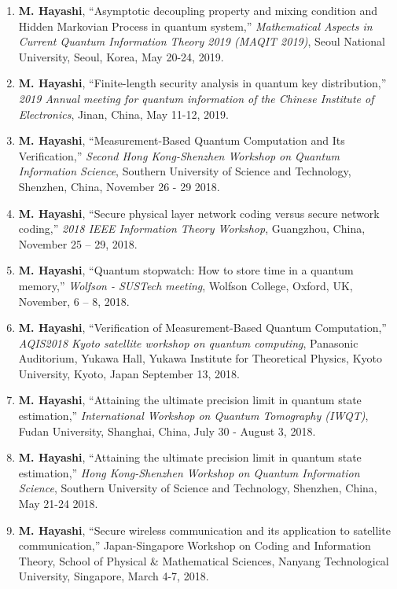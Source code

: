 \documentclass[a4paper,12pt,oneside]{article}
\begin{document}
\begin{enumerate}
\item 
\textbf{M. Hayashi}, 
``Asymptotic decoupling property and mixing condition and Hidden Markovian Process in quantum system,''
{\em Mathematical Aspects in Current Quantum Information Theory 2019 (MAQIT 2019)}, 
Seoul National University, Seoul, Korea,
May 20-24, 2019. 

\item 
\textbf{M. Hayashi}, 
``Finite-length security analysis in quantum key distribution,''
{\em 2019 Annual meeting for quantum information of the Chinese Institute of Electronics},
Jinan, China,
May 11-12, 2019.

\item 
\textbf{M. Hayashi}, 
``Measurement-Based Quantum Computation and Its Verification,''
{\em Second Hong Kong-Shenzhen Workshop on Quantum Information Science}, 
Southern University of Science and Technology, Shenzhen, China,
November 26 - 29 2018.

\item 
\textbf{M. Hayashi}, 
``Secure physical layer network coding versus secure network coding,''
{\em 2018 IEEE Information Theory Workshop}, 
Guangzhou, China, November 25 -- 29, 2018.

\item 
\textbf{M. Hayashi}, 
``Quantum stopwatch: How to store time in a quantum memory,''
{\em Wolfson - SUSTech meeting}, 
Wolfson College, Oxford, UK, November, 6 -- 8,  2018.

\item 
\textbf{M. Hayashi}, 
``Verification of Measurement-Based Quantum Computation,''
{\em AQIS2018 Kyoto satellite workshop on quantum computing}, 
Panasonic Auditorium, Yukawa Hall, Yukawa Institute for Theoretical Physics, Kyoto University, Kyoto, Japan
September 13, 2018.

\item 
\textbf{M. Hayashi}, 
``Attaining the ultimate precision limit in quantum state estimation,''
{\em International Workshop on Quantum Tomography (IWQT)}, 
Fudan University, Shanghai, China,
July 30 - August 3, 2018.


\item 
\textbf{M. Hayashi}, 
``Attaining the ultimate precision limit in quantum state estimation,''
{\em Hong Kong-Shenzhen Workshop on Quantum Information Science}, 
Southern University of Science and Technology, Shenzhen, China,
May 21-24 2018.

\item 
\textbf{M. Hayashi}, ``Secure wireless communication and its application to 
satellite communication,'' 
Japan-Singapore Workshop on Coding and Information Theory, 
School of Physical \& Mathematical Sciences,
Nanyang Technological University,
Singapore, March 4-7, 2018.



\end{enumerate}
\end{document}
